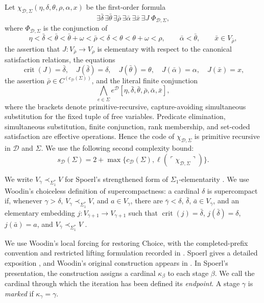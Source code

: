 \documentclass[11pt,a4paper]{amsart}
\newcommand{\crit}{\operatorname{crit}}
\theoremstyle{plain}
\theoremstyle{definition}
\theoremstyle{remark}
\begin{document}
Let $\chi_{\mathcal D,\Sigma}(\eta,\delta,\theta,\rho,\alpha,x)$ be the first-order formula
\[
\exists\bar\delta\,\exists\bar\theta\,\exists\bar\rho\,
\exists\bar\alpha\,\exists\bar x\,\exists J\;\Phi_{\mathcal D,\Sigma},
\]
where $\Phi_{\mathcal D,\Sigma}$ is the conjunction of
\[
\eta<\bar\delta<\bar\theta<\bar\theta+\omega<\bar\rho<
\delta<\theta<\theta+\omega<\rho,\qquad
\bar\alpha<\bar\theta,\qquad \bar x\in V_{\bar\rho},
\]
the assertion that $J:V_{\bar\rho}\to V_\rho$ is elementary with respect to the canonical satisfaction relations, the equations
\[
\crit(J)=\bar\delta,\quad J(\bar\delta)=\delta,\quad
J(\bar\theta)=\theta,\quad J(\bar\alpha)=\alpha,\quad J(\bar x)=x,
\]
the assertion $\bar\rho\in C^{(c_{\mathcal D}(\Sigma))}$, and the literal finite conjunction
\[
\bigwedge_{e\in\Sigma}
e^{\mathcal D}
[\eta,\bar\delta,\bar\theta,\bar\rho,\bar\alpha,\bar x],
\]
where the brackets denote primitive-recursive, capture-avoiding simultaneous substitution for the fixed tuple of free variables.  Predicate elimination, simultaneous substitution, finite conjunction, rank membership, and set-coded satisfaction are effective operations.  Hence the code of $\chi_{\mathcal D,\Sigma}$ is primitive recursive in $\mathcal D$ and $\Sigma$.  We use the following second complexity bound:
\[
s_{\mathcal D}(\Sigma)=2+\max\bigl\{c_{\mathcal D}(\Sigma),
\ell(\ulcorner\chi_{\mathcal D,\Sigma}\urcorner)\bigr\}.
\]
\endgroup

We write $V_\gamma\prec_{\Sigma_1^*}V$ for Spoerl's strengthened form of $\Sigma_1$-elementarity \cite[Definition~20]{Spoerl}.  We use Woodin's choiceless definition of supercompactness: a cardinal $\delta$ is supercompact if, whenever $\gamma>\delta$, $V_\gamma\prec_{\Sigma_1^*}V$, and $a\in V_\gamma$, there are $\bar\gamma<\delta$, $\bar\delta$, $\bar a\in V_{\bar\gamma}$, and an elementary embedding $j:V_{\bar\gamma+1}\to V_{\gamma+1}$ such that $\crit(j)=\bar\delta$, $j(\bar\delta)=\delta$, $j(\bar a)=a$, and $V_{\bar\gamma}\prec_{\Sigma_1^*}V$ \cite[Definition~21]{Spoerl}.

{\color{auditgreen}We use Woodin's local forcing for restoring Choice, with the completed-prefix convention and restricted lifting formulation recorded in \cite[Woodin supplement]{RepairNotes}.}  Spoerl gives a detailed exposition {\cite[Definition~43, Theorem~44(v), and Lemma~45]{Spoerl}}, and Woodin's original construction appears in \cite[pp.~323--324]{Woodin}.  In Spoerl's presentation, the construction assigns a cardinal $\kappa_\beta$ to each stage $\beta$.  We call the cardinal through which the iteration has been defined its \emph{endpoint}.  A stage $\gamma$ is \emph{marked} if $\kappa_\gamma=\gamma$.
\end{document}
